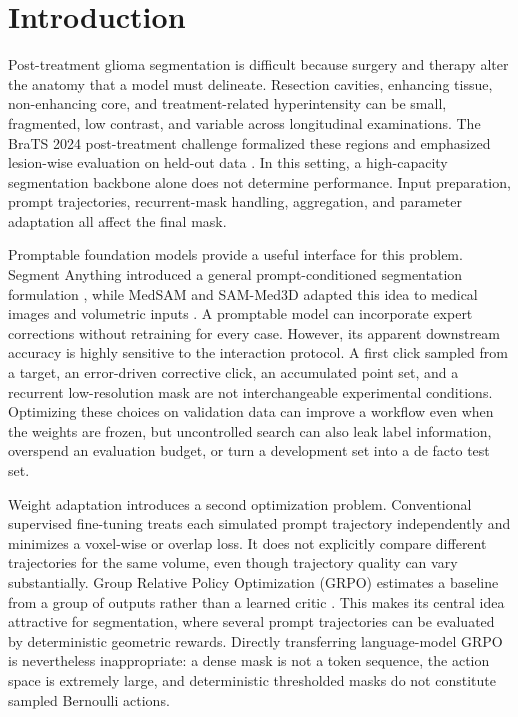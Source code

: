 \documentclass[10pt]{article}
\begin{document}
\section{Introduction}
Post-treatment glioma segmentation is difficult because surgery and therapy alter the anatomy that a model must delineate. Resection cavities, enhancing tissue, non-enhancing core, and treatment-related hyperintensity can be small, fragmented, low contrast, and variable across longitudinal examinations. The BraTS 2024 post-treatment challenge formalized these regions and emphasized lesion-wise evaluation on held-out data \cite{brats2024}. In this setting, a high-capacity segmentation backbone alone does not determine performance. Input preparation, prompt trajectories, recurrent-mask handling, aggregation, and parameter adaptation all affect the final mask.

Promptable foundation models provide a useful interface for this problem. Segment Anything introduced a general prompt-conditioned segmentation formulation \cite{sam}, while MedSAM and SAM-Med3D adapted this idea to medical images and volumetric inputs \cite{medsam,sammed3d}. A promptable model can incorporate expert corrections without retraining for every case. However, its apparent downstream accuracy is highly sensitive to the interaction protocol. A first click sampled from a target, an error-driven corrective click, an accumulated point set, and a recurrent low-resolution mask are not interchangeable experimental conditions. Optimizing these choices on validation data can improve a workflow even when the weights are frozen, but uncontrolled search can also leak label information, overspend an evaluation budget, or turn a development set into a de facto test set.

Weight adaptation introduces a second optimization problem. Conventional supervised fine-tuning treats each simulated prompt trajectory independently and minimizes a voxel-wise or overlap loss. It does not explicitly compare different trajectories for the same volume, even though trajectory quality can vary substantially. Group Relative Policy Optimization (GRPO) estimates a baseline from a group of outputs rather than a learned critic \cite{deepseekmath}. This makes its central idea attractive for segmentation, where several prompt trajectories can be evaluated by deterministic geometric rewards. Directly transferring language-model GRPO is nevertheless inappropriate: a dense mask is not a token sequence, the action space is extremely large, and deterministic thresholded masks do not constitute sampled Bernoulli actions.
\end{document}
